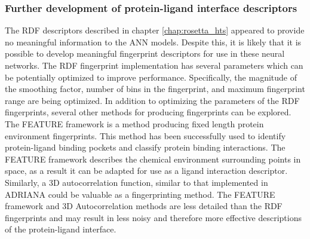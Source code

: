 \subsubsection{Further development of protein-ligand interface descriptors}
The RDF descriptors described in chapter \ref{chap:rosetta_hts} appeared to provide no meaningful information to the ANN models.
Despite this, it is likely that it is possible to develop meaningful fingerprint descriptors for use in these neural networks.
The RDF fingerprint implementation has several parameters which can be potentially optimized to improve performance.
Specifically, the magnitude of the smoothing factor, number of bins in the fingerprint, and maximum fingerprint range are being optimized.
In addition to optimizing the parameters of the RDF fingerprints, several other methods for producing fingerprints can be explored.
The FEATURE framework \citep{Halperin:2008ce} is a method producing fixed length protein environment fingerprints.
This method has been successfully used to identify protein-ligand binding pockets and classify protein binding interactions. 
The FEATURE framework describes the chemical environment surrounding points in space, as a result it can be adapted for use as a ligand interaction descriptor.
Similarly, a 3D autocorrelation function, similar to that implemented in ADRIANA \citep{Code:2011uf} could be valuable as a fingerprinting method.
The FEATURE framework and 3D Autocorrelation methods are less detailed than the \ac{RDF} fingerprints and may result in less noisy and therefore more effective descriptions of the protein-ligand interface.

